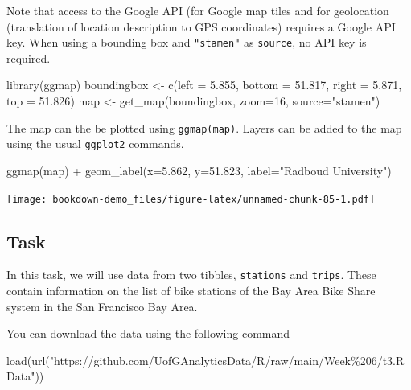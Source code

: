\documentclass[
]{book}
\newenvironment{Shaded}{\begin{snugshade}}{\end{snugshade}}
\newcommand{\AttributeTok}[1]{\textcolor[rgb]{0.77,0.63,0.00}{#1}}
\newcommand{\DecValTok}[1]{\textcolor[rgb]{0.00,0.00,0.81}{#1}}
\newcommand{\FloatTok}[1]{\textcolor[rgb]{0.00,0.00,0.81}{#1}}
\newcommand{\FunctionTok}[1]{\textcolor[rgb]{0.00,0.00,0.00}{#1}}
\newcommand{\NormalTok}[1]{#1}
\newcommand{\OtherTok}[1]{\textcolor[rgb]{0.56,0.35,0.01}{#1}}
\newcommand{\SpecialCharTok}[1]{\textcolor[rgb]{0.00,0.00,0.00}{#1}}
\newcommand{\StringTok}[1]{\textcolor[rgb]{0.31,0.60,0.02}{#1}}
\begin{document}
Note that access to the Google API (for Google map tiles and for geolocation (translation of location description to GPS coordinates) requires a Google API key. When using a bounding box and \texttt{"stamen"} as \texttt{source}, no API key is required.

\begin{Shaded}
\begin{Highlighting}[]
\FunctionTok{library}\NormalTok{(ggmap)}
\NormalTok{boundingbox }\OtherTok{\textless{}{-}} \FunctionTok{c}\NormalTok{(}\AttributeTok{left =} \FloatTok{5.855}\NormalTok{, }\AttributeTok{bottom =} \FloatTok{51.817}\NormalTok{, }\AttributeTok{right =} \FloatTok{5.871}\NormalTok{, }\AttributeTok{top =} \FloatTok{51.826}\NormalTok{)}
\NormalTok{map }\OtherTok{\textless{}{-}} \FunctionTok{get\_map}\NormalTok{(boundingbox, }\AttributeTok{zoom=}\DecValTok{16}\NormalTok{, }\AttributeTok{source=}\StringTok{"stamen"}\NormalTok{)}
\end{Highlighting}
\end{Shaded}

The map can the be plotted using \texttt{ggmap(map)}. Layers can be added to the map using the usual \texttt{ggplot2} commands.

\begin{Shaded}
\begin{Highlighting}[]
\FunctionTok{ggmap}\NormalTok{(map) }\SpecialCharTok{+} 
    \FunctionTok{geom\_label}\NormalTok{(}\AttributeTok{x=}\FloatTok{5.862}\NormalTok{, }\AttributeTok{y=}\FloatTok{51.823}\NormalTok{, }\AttributeTok{label=}\StringTok{"Radboud University"}\NormalTok{) }
\end{Highlighting}
\end{Shaded}

\texttt{[image: bookdown-demo\_files/figure-latex/unnamed-chunk-85-1.pdf]}

\hypertarget{task-8}{%
\subsection{Task}\label{task-8}}

In this task, we will use data from two tibbles, \texttt{stations} and \texttt{trips}. These contain information on the list of bike stations of the Bay Area Bike Share system in the San Francisco Bay Area.

You can download the data using the following command

\begin{Shaded}
\begin{Highlighting}[]
\FunctionTok{load}\NormalTok{(}\FunctionTok{url}\NormalTok{(}\StringTok{"https://github.com/UofGAnalyticsData/R/raw/main/Week\%206/t3.RData"}\NormalTok{))}
\end{Highlighting}
\end{Shaded}
\end{document}

